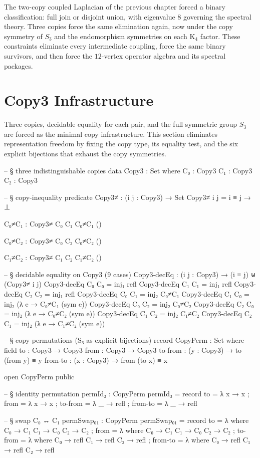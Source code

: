 \documentclass[11pt,a4paper]{book}
\def\texorpdfstring#1#2{#2}%
\begin{document}
The two-copy coupled Laplacian of the previous chapter forced a binary
classification: full join or disjoint union, with eigenvalue $8$ governing the
spectral theory.  Three copies force the same elimination again, now under the
copy symmetry of $S_3$ and the endomorphism symmetries on each K$_4$ factor.
These constraints eliminate every intermediate coupling, force the same binary
survivors, and then force the $12$-vertex operator algebra and its spectral
packages.

\section{Copy\texorpdfstring{$_3$}{3} Infrastructure}

Three copies, decidable equality for each pair, and the full symmetric group
$S_3$ are forced as the minimal copy infrastructure.  This section eliminates
representation freedom by fixing the copy type, its equality test, and the six
explicit bijections that exhaust the copy symmetries.

\begin{code}
-- § three indistinguishable copies
data Copy3 : Set where
  C₀ : Copy3
  C₁ : Copy3
  C₂ : Copy3

-- § copy-inequality predicate
Copy3≠ : (i j : Copy3) → Set
Copy3≠ i j = i ≡ j → ⊥

C₀≠C₁ : Copy3≠ C₀ C₁
C₀≠C₁ ()

C₀≠C₂ : Copy3≠ C₀ C₂
C₀≠C₂ ()

C₁≠C₂ : Copy3≠ C₁ C₂
C₁≠C₂ ()

-- § decidable equality on Copy3 (9 cases)
Copy3-decEq : (i j : Copy3) → (i ≡ j) ⊎ (Copy3≠ i j)
Copy3-decEq C₀ C₀ = inj₁ refl
Copy3-decEq C₁ C₁ = inj₁ refl
Copy3-decEq C₂ C₂ = inj₁ refl
Copy3-decEq C₀ C₁ = inj₂ C₀≠C₁
Copy3-decEq C₁ C₀ = inj₂ (λ e → C₀≠C₁ (sym e))
Copy3-decEq C₀ C₂ = inj₂ C₀≠C₂
Copy3-decEq C₂ C₀ = inj₂ (λ e → C₀≠C₂ (sym e))
Copy3-decEq C₁ C₂ = inj₂ C₁≠C₂
Copy3-decEq C₂ C₁ = inj₂ (λ e → C₁≠C₂ (sym e))

-- § copy permutations (S₃ as explicit bijections)
record CopyPerm : Set where
  field
    to       : Copy3 → Copy3
    from     : Copy3 → Copy3
    to-from  : (y : Copy3) → to (from y) ≡ y
    from-to  : (x : Copy3) → from (to x) ≡ x

open CopyPerm public

-- § identity permutation
permId₃ : CopyPerm
permId₃ = record
  { to = λ x → x
  ; from = λ x → x
  ; to-from = λ _ → refl
  ; from-to = λ _ → refl
  }

-- § swap C₀ ↔ C₁
permSwap₀₁ : CopyPerm
permSwap₀₁ = record
  { to = λ where
      C₀ → C₁
      C₁ → C₀
      C₂ → C₂
  ; from = λ where
      C₀ → C₁
      C₁ → C₀
      C₂ → C₂
  ; to-from = λ where
      C₀ → refl
      C₁ → refl
      C₂ → refl
  ; from-to = λ where
      C₀ → refl
      C₁ → refl
      C₂ → refl
  }
\end{code}
\end{document}
